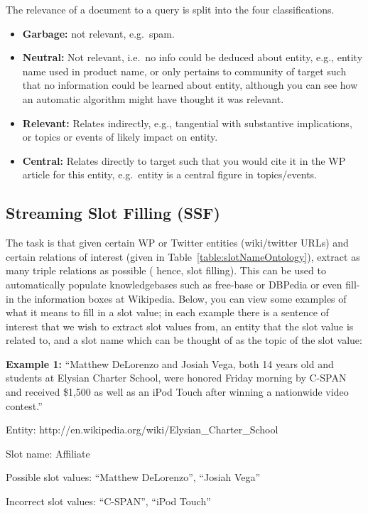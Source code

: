 The relevance of a document to a query is split into the four classifications.
\begin{itemize}[noitemsep]
  \item \textbf{Garbage:} not relevant, e.g.\ spam.
  \item \textbf{Neutral:} Not relevant, i.e.\ no info could be deduced about entity, 
    e.g., entity name used in product name, or only pertains to community of target 
    such that no information could be learned about entity, although you can see how 
    an automatic algorithm might have thought it was relevant.
  \item \textbf{Relevant:} Relates indirectly, e.g., tangential with substantive 
    implications, or topics or events of likely
    impact on entity.
  \item \textbf{Central:} Relates directly to target such that you would cite it in 
    the WP article for this entity, e.g.\ entity is a
    central figure in topics/events.
\end{itemize}


\subsection{Streaming Slot Filling (SSF)}
The task is that given certain WP or Twitter entities 
(wiki/twitter URLs) and certain relations of interest (given in
Table~\ref{table:slotNameOntology}), extract as many triple relations as possible (
hence, slot filling). This can be used to automatically populate knowledgebases 
such as free-base or DBPedia or even fill-in the information boxes at Wikipedia. 
Below, you can view some examples of what it means to fill in a slot value; in 
each example there is a sentence of interest that we wish to extract slot values 
from, an entity that the slot value is related to, and a slot name which can be 
thought of as the topic of the slot value:

\noindent \textbf{Example 1:} ``Matthew DeLorenzo and Josiah Vega, both 14 years old and students 
at Elysian Charter School, were honored Friday morning by C-SPAN and received 
\$1,500 as well as an iPod Touch after winning a nationwide video contest.''

Entity:  http://en.wikipedia.org/wiki/Elysian\_Charter\_School

Slot name: Affiliate

Possible slot values: ``Matthew DeLorenzo'', ``Josiah Vega''

Incorrect slot values: ``C-SPAN'', ``iPod Touch''

